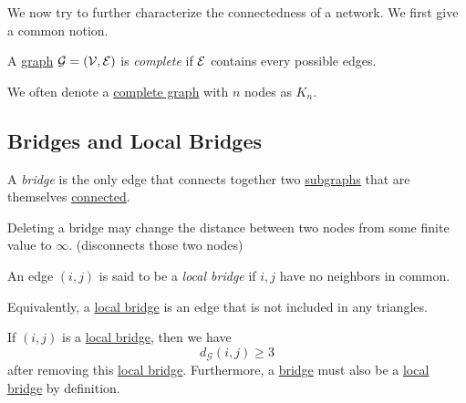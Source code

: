 We now try to further characterize the connectedness of a network. We first give a common notion.
\begin{definition}\label{def:complete-graph}
	A \hyperref[def:graph]{graph} \(\mathcal{\MakeUppercase{g}} = (\mathcal{\MakeUppercase{v}} , \mathcal{\MakeUppercase{e}} )\) is \emph{complete} if \(\mathcal{\MakeUppercase{e}} \) contains every possible edges.
\end{definition}

\begin{notation}
	We often denote a \hyperref[def:complete-graph]{complete graph} with \(n\) nodes as \(K_n\).
\end{notation}

\subsection{Bridges and Local Bridges}
\begin{definition}[Bridge]\label{def:bridge}
	A \emph{bridge} is the only edge that connects together two \hyperref[def:subgraph]{subgraphs} that are themselves \hyperref[def:connected]{connected}.
\end{definition}

\begin{remark}
	Deleting a bridge may change the distance between two nodes from some finite value to \(\infty\). (disconnects those two nodes)
\end{remark}

\begin{definition}\label{def:local-bridge}
	An edge \((i, j)\) is said to be a \emph{local bridge} if \(i, j\) have no neighbors in common.
\end{definition}

\begin{note}
	Equivalently, a \hyperref[def:local-bridge]{local bridge} is an edge that is not included in any triangles.
\end{note}

\begin{remark}
	If \((i, j)\) is a \hyperref[def:local-bridge]{local bridge}, then we have
	\[
		d_{\mathcal{G}}(i, j) \geq  3
	\]
	after removing this \hyperref[def:local-bridge]{local bridge}. Furthermore, a \hyperref[def:bridge]{bridge} must also be a \hyperref[def:local-bridge]{local bridge} by definition.
\end{remark}

